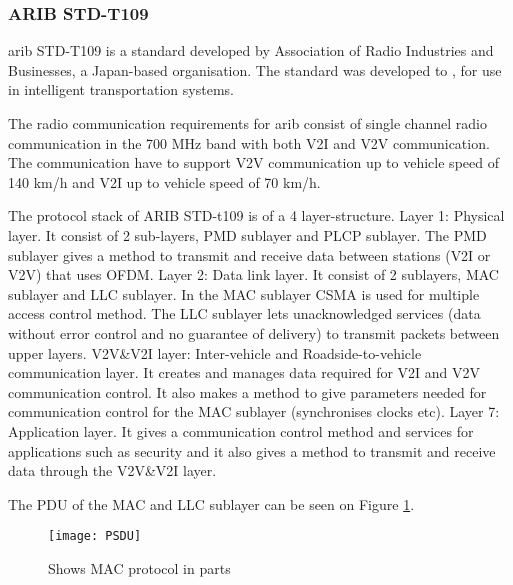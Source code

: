 \subsubsection{ARIB STD-T109}
% 
\acrshort{arib} STD-T109 is a standard developed by Association of Radio Industries and Businesses, a Japan-based organisation. The standard was developed to , for use in intelligent transportation systems.\par
% 
The radio communication requirements for \acrfull{arib} consist of single channel radio communication in the 700 MHz band with both \acrshort{V2I} and \acrshort{V2V} communication. The communication have to support \acrshort{V2V} communication up to vehicle speed of 140 km/h and V2I up to vehicle speed of 70 km/h.\par
% 
The protocol stack of ARIB STD-t109 is of a 4 layer-structure.
Layer 1: Physical layer. It consist of 2 sub-layers, \acrfull{PMD} sublayer and \acrfull{PLCP} sublayer. The \acrshort{PMD} sublayer gives a method to transmit and receive data between stations (\acrshort{V2I} or \acrshort{V2V}) that uses \acrshort{OFDM}.
Layer 2: Data link layer. It consist of 2 sublayers, \acrshort{MAC} sublayer and \acrshort{LLC} sublayer. In the \acrshort{MAC} sublayer \acrshort{CSMA} is used for multiple access control method. The \acrshort{LLC} sublayer lets unacknowledged services (data without error control and no guarantee of delivery) to transmit packets between upper layers.
\acrshort{V2V}\&\acrshort{V2I} layer: Inter-vehicle and Roadside-to-vehicle communication layer. It creates and manages data required for \acrshort{V2I} and \acrshort{V2V} communication control. It also makes a method to give parameters needed for communication control for the \acrshort{MAC} sublayer (synchronises clocks etc).
Layer 7: Application layer. It gives a communication control method and services for applications such as security and it also gives a method to transmit and receive data through the V2V\&V2I layer. 
\par
The \acrfull{PDU} of the \acrshort{MAC} and \acrshort{LLC} sublayer can be seen on Figure \ref{fig:PSDU}.
\begin{figure}
    \centering
    \texttt{[image: PSDU]}
    \caption{Shows \acrshort{MAC} protocol in parts}
    \label{fig:PSDU}
\end{figure}

